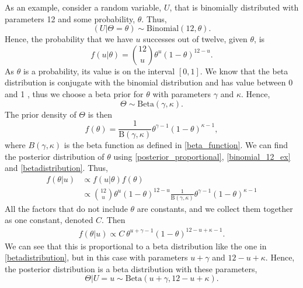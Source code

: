 As an example, consider a random variable, $U$, that is binomially distributed with parameters 12 and some probability, $\theta$. Thus,
\begin{equation*}
    \left( U|\Theta=\theta \right) \sim \mathrm{Binomial}(12,\theta).
\end{equation*}
Hence, the probability that we have $u$ successes out of twelve, given $\theta$, is
\begin{equation}
\label{binomial_12_ex}
    f(u|\theta) = \binom{12}{u} \theta^{u} (1-\theta)^{12-u}.
\end{equation}
As $\theta$ is a probability, its value is on the interval $[0,1]$. We know that the beta distribution is conjugate with the binomial distribution and has value between 0 and 1 \citep{statinf}, thus we choose a beta prior for $\theta$ with parameters $\gamma$ and $\kappa$. Hence,
\begin{equation}
\label{theta_with_beta_prior}
    \Theta \sim \mathrm{Beta}(\gamma,\kappa). 
\end{equation}
The prior density of $\Theta$ is then
\begin{equation}
    \label{betadistribution}
    f(\theta) = \frac{1}{\mathrm{B}(\gamma,\kappa)}\theta^{\gamma-1}(1-\theta)^{\kappa-1},
\end{equation}
where $B(\gamma,\kappa)$ is the beta function as defined in \eqref{beta_function}.
We can find the posterior distribution of $\theta$ using \eqref{posterior_proportional}, \eqref{binomial_12_ex} and \eqref{betadistribution}. Thus,
\begin{equation*}
    \begin{aligned}
        f(\theta|u) 
        &\propto f(u|\theta)f(\theta)\\[6pt]
        &\propto \binom{12}{u} \theta^{u} (1-\theta)^{12-u} \frac{1}{\mathrm{B}(\gamma,\kappa)}\theta^{\gamma-1}(1-\theta)^{\kappa-1}
    \end{aligned}
\end{equation*}
All the factors that do not include $\theta$ are constants, and we collect them together as one constant, denoted $C$. Then
\begin{equation*}
    \begin{aligned}
        f(\theta|u) 
        \propto C \: \theta^{u+\gamma-1}(1-\theta)^{12-u+\kappa-1}.
    \end{aligned}
\end{equation*}
We can see that this is proportional to a beta distribution like the one in \eqref{betadistribution}, but in this case with parameters $u+\gamma$ and $12-u+\kappa$. Hence, the posterior distribution is a beta distribution with these parameters, 
\begin{equation*}
    \Theta|U=u \sim \mathrm{Beta}(u+\gamma,12-u+\kappa).
\end{equation*}






